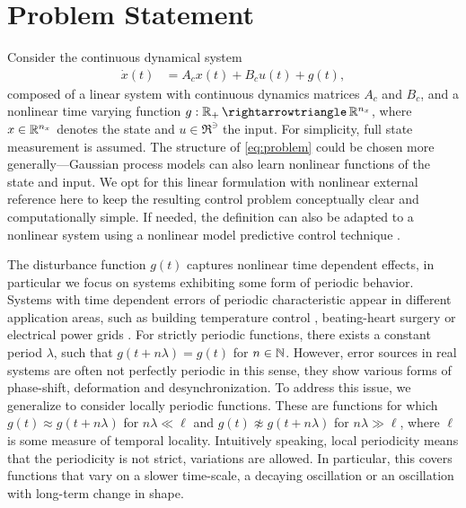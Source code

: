 \section{Problem Statement}
\label{sec:problem_statement}

Consider the continuous dynamical system
\begin{align}
\label{eq:problem}
  \dot x(t) &= A_c x(t) + B_c u(t) + g(t),
\end{align}
composed of a linear system with continuous dynamics matrices $A_c$ and $B_c$,
and a nonlinear time varying function $g:\Re_+ \to \Re^\ns$, where $x\in\mathbb{R}^{n_x}$
denotes the state and $u\in\Re^\ni$ the input. For simplicity, full state
measurement is assumed. The structure of \eqref{eq:problem} could be chosen more
generally---Gaussian process models can also learn nonlinear functions of the
state and input. We opt for this linear formulation with nonlinear external
reference here to keep the resulting control problem conceptually clear and
%
computationally simple. If needed, the definition can also be adapted to a
nonlinear system using a nonlinear model predictive control technique
.

The disturbance function $g(t)$ captures nonlinear time dependent effects, in
particular we focus on systems exhibiting some form of periodic behavior.
Systems with time dependent errors of periodic characteristic appear in
different application areas, such as building temperature control
\cite{Gondhalekar.Oldewurtel.ea:2010:Least-restrictive}, beating-heart surgery
\cite{Yuen.Novotny.ea:2008:Quasiperiodic} or electrical power grids
\cite{Taylor.McSharry:2007:Short}.
For strictly periodic functions, there exists a constant period $\lambda$, such
that $g(t+n\lambda)=g(t)$ for $n\in\mathbb{N}$. However, error sources in real systems
are often not perfectly periodic in this sense, they show various forms of
phase-shift, deformation and desynchronization. To address this issue, we
generalize to consider locally periodic functions. These are functions for which
$g(t) \approx g(t+n\lambda)$ for $n\lambda \ll \ell$ and $g(t) \not\approx
g(t+n\lambda)$ for $n\lambda\gg\ell$, where $\ell$ is some measure of temporal
locality. Intuitively speaking, local periodicity means that the periodicity is
not strict, \ie variations are allowed. In particular, this covers functions
that vary on a slower time-scale, \eg a decaying oscillation or an oscillation
with long-term change in shape.

